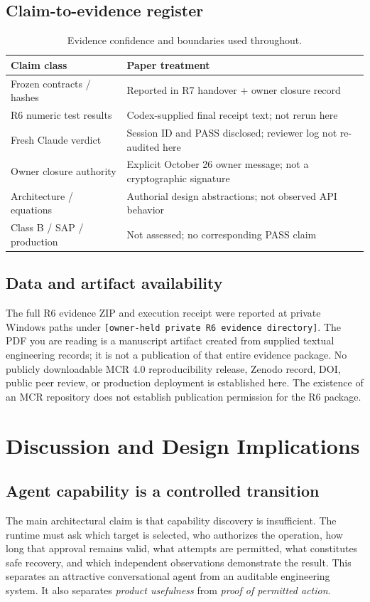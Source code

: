 \documentclass[11pt,twocolumn]{article}
\newcommand{\code}[1]{\texttt{#1}}
\begin{document}
\subsection{Claim-to-evidence register}
\begin{table}[t]
\centering\caption{Evidence confidence and boundaries used throughout.}
\label{tab:claim}
\footnotesize
\begin{tabularx}{\columnwidth}{@{}p{}X@{}}
\toprule
\textbf{Claim class} & \textbf{Paper treatment}\\\midrule
Frozen contracts / hashes & Reported in R7 handover + owner closure record\\
R6 numeric test results & Codex-supplied final receipt text; not rerun here\\
Fresh Claude verdict & Session ID and PASS disclosed; reviewer log not re-audited here\\
Owner closure authority & Explicit October 26 owner message; not a cryptographic signature\\
Architecture / equations & Authorial design abstractions; not observed API behavior\\
Class B / SAP / production & Not assessed; no corresponding PASS claim\\\bottomrule
\end{tabularx}
\end{table}

\subsection{Data and artifact availability}
The full R6 evidence ZIP and execution receipt were reported at private Windows paths under \code{[owner-held private R6 evidence directory]}. The PDF you are reading is a manuscript artifact created from supplied textual engineering records; it is not a publication of that entire evidence package. No publicly downloadable MCR 4.0 reproducibility release, Zenodo record, DOI, public peer review, or production deployment is established here. The existence of an MCR repository does not establish publication permission for the R6 package.

\section{Discussion and Design Implications}
\subsection{Agent capability is a controlled transition}
The main architectural claim is that capability discovery is insufficient. The runtime must ask which target is selected, who authorizes the operation, how long that approval remains valid, what attempts are permitted, what constitutes safe recovery, and which independent observations demonstrate the result. This separates an attractive conversational agent from an auditable engineering system. It also separates \emph{product usefulness} from \emph{proof of permitted action}.
\end{document}
